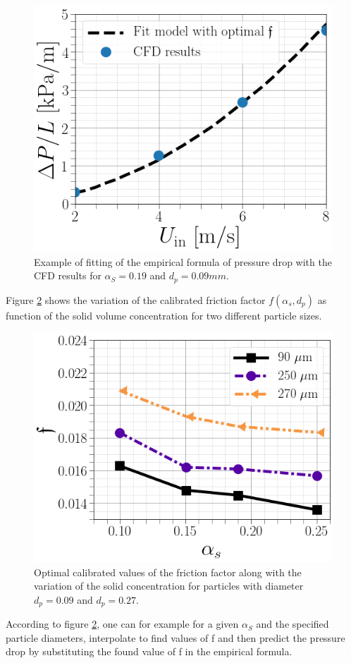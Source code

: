 \documentclass[review,3p,times,12pt]{elsarticle}
\begin{document}
\begin{figure}[H]
\begin{center}
\includegraphics[scale = 0.35]{figs/alpha3D0.png}
\caption{Example of fitting of the empirical formula of pressure drop with the CFD results for $\alpha_S = 0.19$ and $d_p = 0.09 mm$.}
\label{optimal}
\end{center}
\end{figure}

Figure \ref{surro} shows the variation of the calibrated friction factor $f(\alpha_s,d_p)$ as function of the solid volume concentration for two different particle sizes.
\begin{figure}[H]
\begin{center}
\includegraphics[scale = 0.35]{figs/suur.png}
\caption{Optimal calibrated values of the friction factor along with the variation of the solid concentration for particles with diameter $d_p=0.09$ and $d_p=0.27$.}
\label{surro}
\end{center}
\end{figure}
According to figure \ref{surro}, one can for example for a given $\alpha_S$ and the specified particle diameters, interpolate to find values of f and then predict the pressure drop by substituting the found value of f in the empirical formula.
\end{document}
